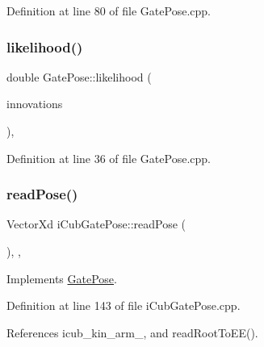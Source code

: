 Definition at line 80 of file Gate\+Pose.\+cpp.

\mbox{\label{classGatePose_a939c575d5d59c8b0f3ab528edd368c0d}} 
\subsubsection{\texorpdfstring{likelihood()}{likelihood()}}
{\footnotesize\ttfamily double Gate\+Pose\+::likelihood (\begin{DoxyParamCaption}\item[{const Eigen\+::\+Ref$<$ const Eigen\+::\+Matrix\+Xf $>$ \&}]{innovations }\end{DoxyParamCaption})\hspace{0.3cm}{\ttfamily [override]}, {\ttfamily [inherited]}}



Definition at line 36 of file Gate\+Pose.\+cpp.

\mbox{\label{classiCubGatePose_aff1494edcf8f17803788f954ba0b443b}} 
\subsubsection{\texorpdfstring{read\+Pose()}{readPose()}}
{\footnotesize\ttfamily Vector\+Xd i\+Cub\+Gate\+Pose\+::read\+Pose (\begin{DoxyParamCaption}{ }\end{DoxyParamCaption})\hspace{0.3cm}{\ttfamily [override]}, {\ttfamily [protected]}, {\ttfamily [virtual]}}



Implements \hyperlink{classGatePose_aed9235df850c3ca930f9e43276bf4f62}{Gate\+Pose}.



Definition at line 143 of file i\+Cub\+Gate\+Pose.\+cpp.



References icub\+\_\+kin\+\_\+arm\+\_\+, and read\+Root\+To\+E\+E().

